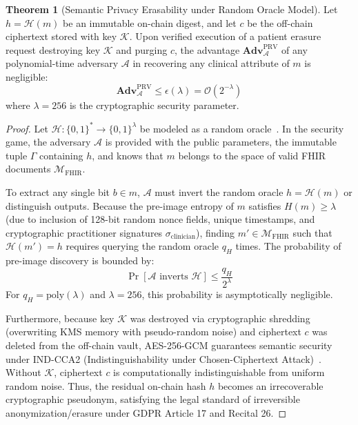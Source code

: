 \documentclass[journal]{IEEEtran}
\theoremstyle{definition}
\newtheorem{theorem}{Theorem}
\begin{document}
\begin{theorem}[Semantic Privacy Erasability under Random Oracle Model]
\label{thm:gdpr}
Let $h = \mathcal{H}(m)$ be an immutable on-chain digest, and let $c$ be the off-chain ciphertext stored with key $\mathcal{K}$. Upon verified execution of a patient erasure request destroying key $\mathcal{K}$ and purging $c$, the advantage $\mathbf{Adv}_{\mathcal{A}}^{\text{PRV}}$ of any polynomial-time adversary $\mathcal{A}$ in recovering any clinical attribute of $m$ is negligible:
\begin{equation}
\mathbf{Adv}_{\mathcal{A}}^{\text{PRV}} \le \epsilon(\lambda) = \mathcal{O}(2^{-\lambda})
\end{equation}
where $\lambda = 256$ is the cryptographic security parameter.
\end{theorem}

\begin{proof}
Let $\mathcal{H}: \{0,1\}^* \to \{0,1\}^\lambda$ be modeled as a random oracle~\cite{bellare1993random}. In the security game, the adversary $\mathcal{A}$ is provided with the public parameters, the immutable tuple $\Gamma$ containing $h$, and knows that $m$ belongs to the space of valid FHIR documents $\mathcal{M}_{\text{FHIR}}$. 

To extract any single bit $b \in m$, $\mathcal{A}$ must invert the random oracle $h = \mathcal{H}(m)$ or distinguish outputs. Because the pre-image entropy of $m$ satisfies $H(m) \ge \lambda$ (due to inclusion of 128-bit random nonce fields, unique timestamps, and cryptographic practitioner signatures $\sigma_{\text{clinician}}$), finding $m' \in \mathcal{M}_{\text{FHIR}}$ such that $\mathcal{H}(m') = h$ requires querying the random oracle $q_H$ times. The probability of pre-image discovery is bounded by:
\begin{equation}
\Pr[\mathcal{A} \text{ inverts } \mathcal{H}] \le \frac{q_H}{2^\lambda}
\end{equation}
For $q_H = \text{poly}(\lambda)$ and $\lambda = 256$, this probability is asymptotically negligible. 

Furthermore, because key $\mathcal{K}$ was destroyed via cryptographic shredding (overwriting KMS memory with pseudo-random noise) and ciphertext $c$ was deleted from the off-chain vault, AES-256-GCM guarantees semantic security under IND-CCA2 (Indistinguishability under Chosen-Ciphertext Attack)~\cite{bellare2000authenticated}. Without $\mathcal{K}$, ciphertext $c$ is computationally indistinguishable from uniform random noise. Thus, the residual on-chain hash $h$ becomes an irrecoverable cryptographic pseudonym, satisfying the legal standard of irreversible anonymization/erasure under GDPR Article 17 and Recital 26.
\end{proof}
\end{document}
